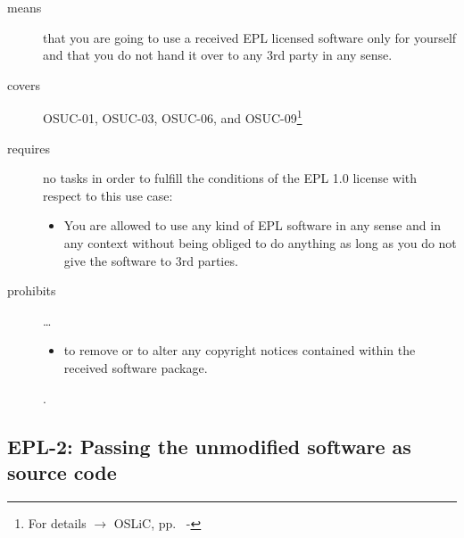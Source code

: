 \begin{description}

\item[means] that you are going to use a received EPL licensed software only
for yourself and that you do not hand it over to any 3rd party in any sense.

\item[covers] OSUC-01, OSUC-03, OSUC-06, and OSUC-09\footnote{For details 
$\rightarrow$ OSLiC, pp.\ \pageref{OSUC-01-DEF} - \pageref{OSUC-09-DEF}}

\item[requires] no tasks in order to fulfill the conditions of the EPL 1.0
license with respect to this use case:
  \begin{itemize}
    \item You are allowed to use any kind of EPL software in any sense and in
    any context without being obliged to do anything as long as you do not
    give the software to 3rd parties.
  \end{itemize}

\item[prohibits] \ldots
\begin{itemize}
  \item to remove or to alter any copyright notices contained within the
  received software package.
\end{itemize}.

\end{description}

\subsection{EPL-2: Passing the unmodified software as source code}
\label{OSUC-02-EPL} \label{OSUC-05-EPL} \label{OSUC-07-EPL} 

